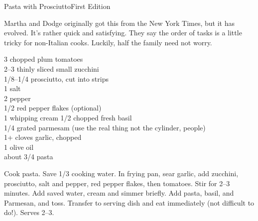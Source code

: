 \begin{entry}{Pasta with Prosciutto}{First Edition}

\begin{open}
  Martha and Dodge originally got this from the New York Times, but it has
  evolved. It's rather quick and satisfying. They say the order of tasks is a
  little tricky for non-Italian cooks. Luckily, half the family need not worry.
\end{open}
\begin{ingredients}
  \SI{3}{\cup} chopped plum tomatoes\\
  \numrange{2}{3} thinly sliced small zucchini\\
  \SIrange{1/8}{1/4}{\pound} prosciutto, cut into strips\\
  \SI{1}{\teaspoon} salt\\
  \SI{2}{\teaspoon} pepper\\
  \SI{1/2}{\teaspoon} red pepper flakes (optional)\\
  \SI{1}{\cup} whipping cream
  \SI{1/2}{\cup} chopped fresh basil\\
  \SI{1/4}{\cup} grated parmesam (use the real thing not the cylinder, people)\\
  1+ cloves garlic, chopped\\
  \SI{1}{\tblspoon} olive oil\\
  about \SI{3/4}{\pound} pasta
\end{ingredients}
Cook pasta. Save \SI{1/3}{\cup} cooking water. In frying pan, sear garlic, add
zucchini, prosciutto, salt and pepper, red pepper flakes, then tomatoes.  Stir
for \numrange{2}{3} minutes.  Add saved water, cream and simmer briefly. Add
pasta, basil, and Parmesan, and toss. Transfer to serving dish and eat
immediately (not difficult to do!). Serves \numrange{2}{3}.
\end{entry}

